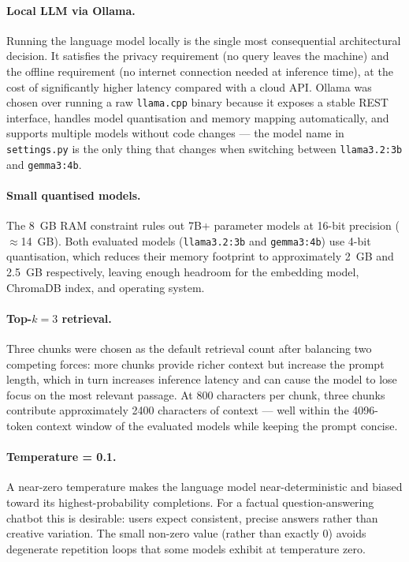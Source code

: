 \paragraph{Local LLM via Ollama.}
Running the language model locally is the single most consequential architectural decision. It satisfies the privacy requirement (no query leaves the machine) and the offline requirement (no internet connection needed at inference time), at the cost of significantly higher latency compared with a cloud API. Ollama was chosen over running a raw \texttt{llama.cpp} binary because it exposes a stable REST interface, handles model quantisation and memory mapping automatically, and supports multiple models without code changes — the model name in \texttt{settings.py} is the only thing that changes when switching between \texttt{llama3.2:3b} and \texttt{gemma3:4b}.

\paragraph{Small quantised models.}
The 8~GB RAM constraint rules out 7B+ parameter models at 16-bit precision ($\approx$14~GB). Both evaluated models (\texttt{llama3.2:3b} and \texttt{gemma3:4b}) use 4-bit quantisation, which reduces their memory footprint to approximately 2~GB and 2.5~GB respectively, leaving enough headroom for the embedding model, ChromaDB index, and operating system.

\paragraph{Top-$k = 3$ retrieval.}
Three chunks were chosen as the default retrieval count after balancing two competing forces: more chunks provide richer context but increase the prompt length, which in turn increases inference latency and can cause the model to lose focus on the most relevant passage. At 800 characters per chunk, three chunks contribute approximately 2400 characters of context — well within the 4096-token context window of the evaluated models while keeping the prompt concise.

\paragraph{Temperature = 0.1.}
A near-zero temperature makes the language model near-deterministic and biased toward its highest-probability completions. For a factual question-answering chatbot this is desirable: users expect consistent, precise answers rather than creative variation. The small non-zero value (rather than exactly 0) avoids degenerate repetition loops that some models exhibit at temperature zero.

